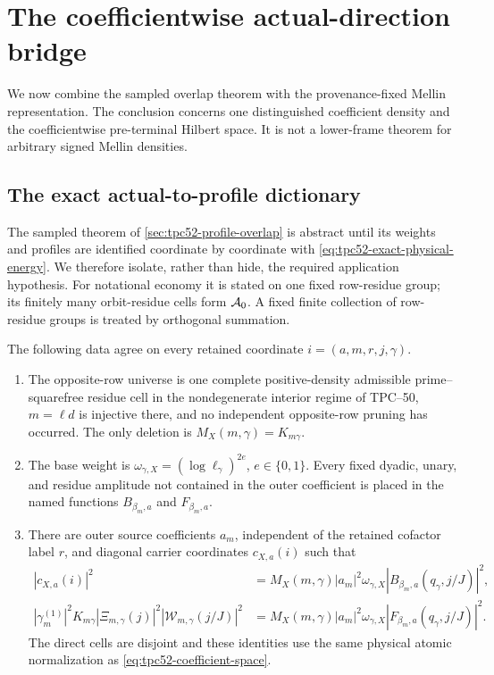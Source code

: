 \section{The coefficientwise actual-direction bridge}
\label{sec:tpc52-actual-bridge}

We now combine the sampled overlap theorem with the provenance-fixed Mellin
representation.  The conclusion concerns one distinguished coefficient
density and the coefficientwise pre-terminal Hilbert space.  It is not a
lower-frame theorem for arbitrary signed Mellin densities.

\subsection{The exact actual-to-profile dictionary}

The sampled theorem of \cref{sec:tpc52-profile-overlap} is abstract until its
weights and profiles are identified coordinate by coordinate with
\eqref{eq:tpc52-exact-physical-energy}.  We therefore isolate, rather than
hide, the required application hypothesis.  For notational economy it is
stated on one fixed row-residue group; its finitely many orbit-residue cells
form \(\mathcal A_0\).  A fixed finite collection of row-residue groups is treated
by orthogonal summation.

\begin{assumption}
\label{ass:tpc52-exact-profile-dictionary}
The following data agree on every retained coordinate
\(i=(a,m,r,j,\gamma)\).
\begin{enumerate}[label=\textup{(I\arabic*)},leftmargin=3.2em]
 \item The opposite-row universe is one complete positive-density
 admissible prime--squarefree residue cell in the nondegenerate interior
 regime of TPC--50, \(m=\ell d\) is injective there, and no independent
 opposite-row pruning has occurred.  The only deletion is
 \(M_X(m,\gamma)=K_{m\gamma}\).
 \item The base weight is
 \(\omega_{\gamma,X}=(\log\ell_\gamma)^{2e}\),
 \(e\in\{0,1\}\).  Every fixed dyadic, unary, and residue amplitude not
 contained in the outer coefficient is placed in the named functions
 \(B_{\beta_m,a}\) and \(F_{\beta_m,a}\).
 \item There are outer source coefficients \(a_m\), independent of the
 retained cofactor label \(r\), and diagonal carrier
 coordinates \(c_{X,a}(i)\) such that
 \begin{align}
  |c_{X,a}(i)|^2
  &={}
  M_X(m,\gamma)|a_m|^2\omega_{\gamma,X}
  |B_{\beta_m,a}(q_\gamma,j/J)|^2,
  \label{eq:tpc52-carrier-coordinate-dictionary}\\
  |\gamma_m^{(1)}|^2K_{m\gamma}
  |\Xi_{m,\gamma}(j)|^2
  |\mathcal W_{m,\gamma}(j/J)|^2
  &={}
  M_X(m,\gamma)|a_m|^2\omega_{\gamma,X}
  |F_{\beta_m,a}(q_\gamma,j/J)|^2.
  \label{eq:tpc52-profile-coordinate-dictionary}
 \end{align}
 The direct cells are disjoint and these identities use the same physical
 atomic normalization as \eqref{eq:tpc52-coefficient-space}.
\end{enumerate}
\end{assumption}

